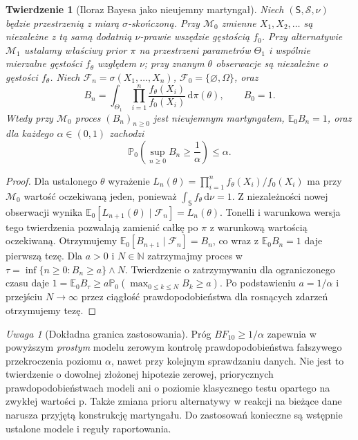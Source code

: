 \documentclass[11pt,a4paper,oneside]{report}
\numberwithin{equation}{chapter}
\theoremstyle{plain}
\newtheorem{twierdzenie}{Twierdzenie}[chapter]
\theoremstyle{definition}
\theoremstyle{remark}
\newtheorem{uwaga}{Uwaga}[chapter]
\newcommand{\N}{\mathbb N}
\newcommand{\Prob}{\mathbb P}
\newcommand{\E}{\mathbb E}
\newcommand{\dd}{\mathrm d}
\begin{document}
\begin{twierdzenie}[Iloraz Bayesa jako nieujemny martyngał]
\label{thm:bayes-factor-martingale}
Niech $(\mathsf S,\mathcal S,\nu)$ będzie przestrzenią
z miarą $\sigma$-skończoną. Przy $\mathcal M_0$ zmienne
$X_1,X_2,\ldots$ są niezależne z tą samą dodatnią
$\nu$-prawie wszędzie gęstością $f_0$.
Przy alternatywie $\mathcal M_1$ ustalamy właściwy prior
$\pi$ na przestrzeni parametrów $\Theta_1$ i
wspólnie mierzalne gęstości $f_\theta$ względem $\nu$;
przy znanym $\theta$ obserwacje są niezależne o gęstości
$f_\theta$. Niech $\mathcal F_n=\sigma(X_1,\ldots,X_n)$,
$\mathcal F_0=\{\varnothing,\Omega\}$, oraz
\[
 B_n=\int_{\Theta_1}\prod_{i=1}^n
    \frac{f_\theta(X_i)}{f_0(X_i)}\,\dd\pi(\theta),
 \qquad B_0=1.
\]
Wtedy przy $\mathcal M_0$ proces $(B_n)_{n\ge0}$ jest
nieujemnym martyngałem, $\E_0 B_n=1$, oraz dla
każdego $\alpha\in(0,1)$ zachodzi
\[
 \Prob_0\!\left(\sup_{n\ge0}B_n\ge\frac1\alpha\right)
 \le\alpha.
\]
\end{twierdzenie}
\begin{proof}
Dla ustalonego $\theta$ wyrażenie
$L_n(\theta)=\prod_{i=1}^n f_\theta(X_i)/f_0(X_i)$
ma przy $\mathcal M_0$ wartość oczekiwaną jeden, ponieważ
$\int_{\mathsf S} f_\theta\,\dd\nu=1$.
Z niezależności nowej obserwacji wynika
$\E_0[L_{n+1}(\theta)\mid\mathcal F_n]=L_n(\theta)$.
Tonelli i warunkowa wersja tego twierdzenia pozwalają
zamienić całkę po $\pi$ z warunkową wartością oczekiwaną.
Otrzymujemy $\E_0[B_{n+1}\mid\mathcal F_n]=B_n$,
co wraz z $\E_0B_n=1$ daje pierwszą tezę.
Dla $a>0$ i $N\in\N$ zatrzymajmy proces w
$\tau=\inf\{n\ge0:B_n\ge a\}\wedge N$.
Twierdzenie o zatrzymywaniu dla ograniczonego czasu daje
$1=\E_0 B_\tau\ge a\Prob_0(\max_{0\le k\le N}B_k\ge a)$.
Po podstawieniu $a=1/\alpha$ i przejściu $N\to\infty$
przez ciągłość prawdopodobieństwa dla rosnących zdarzeń
otrzymujemy tezę.
\end{proof}

\begin{uwaga}[Dokładna granica zastosowania]
Próg $BF_{10}\ge1/\alpha$ zapewnia w powyższym
\emph{prostym} modelu zerowym kontrolę prawdopodobieństwa
fałszywego przekroczenia poziomu $\alpha$, nawet przy
kolejnym sprawdzaniu danych. Nie jest to twierdzenie
o dowolnej złożonej hipotezie zerowej, priorycznych
prawdopodobieństwach modeli ani o poziomie klasycznego
testu opartego na zwykłej wartości p. Także zmiana prioru
alternatywy w reakcji na bieżące dane narusza przyjętą
konstrukcję martyngału. Do zastosowań konieczne są
wstępnie ustalone modele i reguły raportowania.
\end{uwaga}
\end{document}

